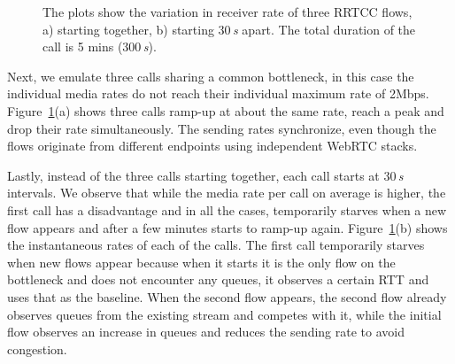 \begin{figure}[!t]
\centerline{
  }
  \centerline{
  }
   \caption{The plots show the variation in receiver rate of three RRTCC
   flows, a) starting together, b) starting 30\,\emph{s} apart. The total duration of
   the call is 5 mins (300\,\emph{s}).}
\label{fig:rrtcc-self-fair}
\end{figure}

\begin{table}[!t]
\begin{center}
\end{center}
    \caption{RRTCC competing with similar cross-traffic on the bottleneck link.}
    \label{tab:self-fair}
\end{table}

Next, we emulate three calls sharing a common bottleneck, in this case the
individual media rates do not reach their individual maximum rate of 2Mbps.
Figure~\ref{fig:rrtcc-self-fair}(a) shows three calls ramp-up at about the
same rate, reach a peak and drop their rate simultaneously. The sending rates
synchronize, even though the flows originate from different endpoints using
independent WebRTC stacks.

Lastly, instead of the three calls starting together, each call starts at 30\,\emph{s}
intervals. We observe that while the media rate per call on average is higher,
the first call has a disadvantage and in all the cases, temporarily starves
when a new flow appears and after a few minutes starts to ramp-up again.
Figure~\ref{fig:rrtcc-self-fair}(b) shows the instantaneous rates of each of
the calls. The first call temporarily starves when new flows appear because
when it starts it is the only flow on the bottleneck and does not encounter
any queues, it observes a certain RTT and uses that as the baseline. When the
second flow appears, the second flow already observes queues from the existing
stream and competes with it, while the initial flow observes an increase in
queues and reduces the sending rate to avoid congestion.


